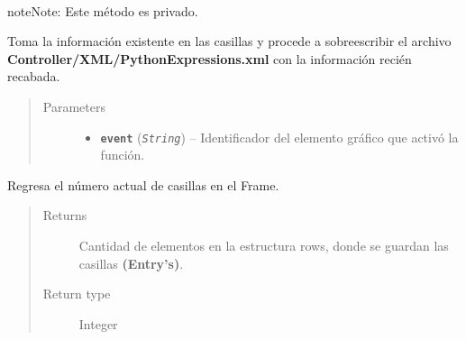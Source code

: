 \documentclass[class=report, crop=false]{standalone}
\begin{document}
\begin{fulllineitems}
\begin{fulllineitems}
~

\begin{notice}{note}{Note:}
Este método es privado.
\end{notice}

Toma la información existente en las casillas y procede a 
sobreescribir el archivo \textbf{Controller/XML/PythonExpressions.xml} 
con la información recién recabada.

\begin{quote}\begin{description}
\item[{Parameters}] \leavevmode\begin{itemize}
\item \textbf{\texttt{event}} (\emph{\texttt{String}}) -- Identificador del elemento gráfico que activó la función.
\end{itemize}
\end{description}\end{quote}

\end{fulllineitems}

\begin{fulllineitems}

Regresa el número actual de casillas en el Frame.

\begin{quote}\begin{description}
\item[{Returns}] \leavevmode
Cantidad de elementos en la estructura rows, donde se guardan las casillas \textbf{(Entry's)}.
\item[{Return type}] \leavevmode
Integer
\end{description}\end{quote}

\end{fulllineitems}

\end{fulllineitems}

\end{document}
